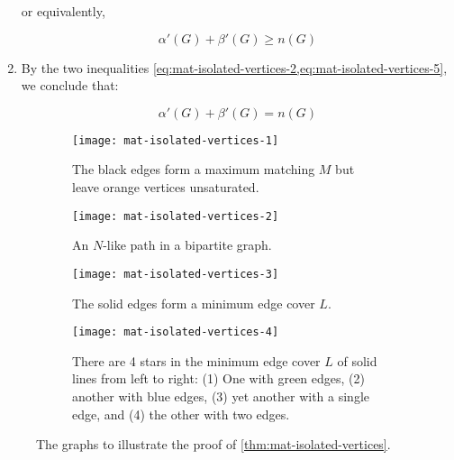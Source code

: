 \documentclass[../src/handouts/main.tex]{subfiles}
\begin{document}
\begin{enumerate}
    or equivalently,

    \begin{equation}
      \alpha'(G) + \beta'(G) \geq n(G)
      \label{eq:mat-isolated-vertices-5}
    \end{equation}

  \item By the two inequalities \cref{eq:mat-isolated-vertices-2,eq:mat-isolated-vertices-5}, we conclude that:

    \begin{equation}
      \alpha'(G) + \beta'(G) = n(G)
      \label{eq:mat-isolated-vertices-56}
    \end{equation}

\end{enumerate}

\begin{figure}
  \centering
  \begin{subfigure}[t]{.45\textwidth}
    \centering
    \texttt{[image: mat-isolated-vertices-1]}
    \caption{The black edges form a maximum matching $M$ but leave orange vertices unsaturated.}
    \label{fig:mat-isolated-vertices-1}
  \end{subfigure}
  \hfill
  \begin{subfigure}[t]{.45\textwidth}
    \centering
    \texttt{[image: mat-isolated-vertices-2]}
    \caption{An $N$-like path in a bipartite graph.}
    \label{fig:mat-isolated-vertices-2}
  \end{subfigure}

  \begin{subfigure}[t]{.45\textwidth}
    \centering
    \texttt{[image: mat-isolated-vertices-3]}
    \caption{The solid edges form a minimum edge cover $L$.}
    \label{fig:mat-isolated-vertices-3}
  \end{subfigure}
  \hfill
  \begin{subfigure}[t]{.45\textwidth}
    \centering
    \texttt{[image: mat-isolated-vertices-4]}
    \caption{There are 4 stars in the minimum edge cover $L$ of solid lines from left to right: (1) One with green edges, (2) another with blue edges, (3) yet another with a single edge, and (4) the other with two edges.}
    \label{fig:mat-isolated-vertices-4}
  \end{subfigure}

  \caption{The graphs to illustrate the proof of \cref{thm:mat-isolated-vertices}.}
  \label{fig:mat-isolated-vertices}
\end{figure}
\end{document}
